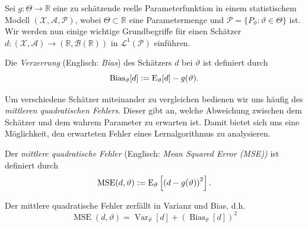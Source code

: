 Sei $g\colon \Theta \to \mathbb {R}$ eine zu schätzende reelle Parameterfunktion in einem statistischem Modell $(\mathcal{X},\mathcal {A},\mathcal{P})$, wobei $\Theta \subset \mathbb{R}$ eine Parametermenge und $\mathcal{P} = \{P_{\vartheta } \colon \vartheta \in \Theta \}$ ist. Wir werden nun einige wichtige Grundbegriffe für einen Schätzer $d \colon (\mathcal{X}, \mathcal{A}) \rightarrow (\mathbb{R}, \mathcal{B}(\mathbb{R}))$ in $\mathcal{L}^1(\mathcal{P})$ einführen.

\begin{defn}
Die \textit{Verzerrung} (Englisch: \textit{Bias}) des Schätzers $d$ bei $\vartheta$ ist definiert durch
$$\operatorname {Bias} _{\vartheta }[d] \vcentcolon= \operatorname {E} _{\vartheta }[d]-g(\vartheta ).$$
\end{defn}


Um verschiedene Schätzer miteinander zu vergleichen bedienen wir uns häufig des \textit{mittleren quadratischen Fehlers}. Dieser gibt an, welche Abweichung zwischen dem Schätzer und dem wahrem Parameter zu erwarten ist. Damit bietet sich uns eine Möglichkeit, den erwarteten Fehler eines Lernalgorithmus zu analysieren.

\begin{defn}
Der \textit{mittlere quadratische Fehler} (Englisch: \textit{Mean Squared Error (MSE))} ist definiert durch
$$\operatorname {MSE} (d,\vartheta ) \vcentcolon= \operatorname{E} _{\vartheta}\left[\left(d-g(\vartheta )\right)^{2}\right].$$
\end{defn}

\begin{thm}
Der mittlere quadratische Fehler zerfällt in Varianz und Bias, d.h.
$$\operatorname{MSE} (d,\vartheta) = \operatorname{Var}_{\vartheta}[d]+\left(\operatorname{Bias}_{\vartheta}[d]\right)^{2}$$
\end{thm}

